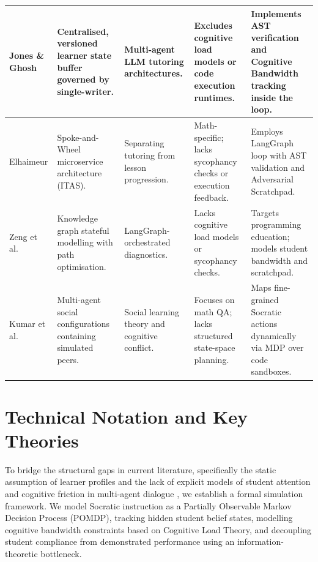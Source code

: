 \documentclass[11pt,a4paper]{report}
\begin{document}
{\begin{longtable}{@{}P{0.15\textwidth}P{0.22\textwidth}P{0.16\textwidth}P{0.18\textwidth}P{0.17\textwidth}@{}}
\midrule
Jones \& Ghosh \cite{jones2025intellicode} & Centralised, versioned learner state buffer governed by single-writer. & Multi-agent LLM tutoring architectures. & Excludes cognitive load models or code execution runtimes. & Implements AST verification and Cognitive Bandwidth tracking inside the loop. \\
\midrule
Elhaimeur \cite{elhaimeur2026itas} & Spoke-and-Wheel microservice architecture (ITAS). & Separating tutoring from lesson progression. & Math-specific; lacks sycophancy checks or execution feedback. & Employs LangGraph loop with AST validation and Adversarial Scratchpad. \\
\midrule
Zeng et al. \cite{zeng2025graphmasal} & Knowledge graph stateful modelling with path optimisation. & LangGraph-orchestrated diagnostics. & Lacks cognitive load models or sycophancy checks. & Targets programming education; models student bandwidth and scratchpad. \\
\midrule
Kumar et al. \cite{kumar2026beyond} & Multi-agent social configurations containing simulated peers. & Social learning theory and cognitive conflict. & Focuses on math QA; lacks structured state-space planning. & Maps fine-grained Socratic actions dynamically via MDP over code sandboxes. \\
\end{longtable}
}

\section{Technical Notation and Key Theories}
To bridge the structural gaps in current literature, specifically the static assumption of learner profiles \cite{yuan2026towards} and the lack of explicit models of student attention and cognitive friction in multi-agent dialogue \cite{ozdemir2026enhancing}, we establish a formal simulation framework. We model Socratic instruction as a Partially Observable Markov Decision Process (POMDP), tracking hidden student belief states, modelling cognitive bandwidth constraints based on Cognitive Load Theory, and decoupling student compliance from demonstrated performance using an information-theoretic bottleneck.
\end{document}
